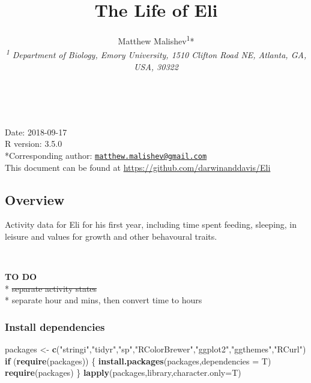 \documentclass[10,portrait]{article}
\title{The Life of Eli}
\author{Matthew Malishev\textsuperscript{1}*\\
\emph{\textsuperscript{1} Department of Biology, Emory University, 1510
Clifton Road NE, Atlanta, GA, USA, 30322}}
\date{}
\newenvironment{Shaded}{\begin{snugshade}}{\end{snugshade}}
\newcommand{\KeywordTok}[1]{\textcolor[rgb]{0.13,0.29,0.53}{\textbf{#1}}}
\newcommand{\DataTypeTok}[1]{\textcolor[rgb]{0.13,0.29,0.53}{#1}}
\newcommand{\StringTok}[1]{\textcolor[rgb]{0.31,0.60,0.02}{#1}}
\newcommand{\ControlFlowTok}[1]{\textcolor[rgb]{0.13,0.29,0.53}{\textbf{#1}}}
\newcommand{\NormalTok}[1]{#1}
\begin{document}
\maketitle

{
\hypersetup{linkcolor=black}
\setcounter{tocdepth}{4}
\tableofcontents
}
~

Date: 2018-09-17\\
R version: 3.5.0\\
*Corresponding author:
\href{mailto:matthew.malishev@gmail.com}{\nolinkurl{matthew.malishev@gmail.com}}\\
This document can be found at
\url{https://github.com/darwinanddavis/Eli}

\newpage  

\subsection{Overview}\label{overview}

Activity data for Eli for his first year, including time spent feeding,
sleeping, in leisure and values for growth and other behavoural traits.

~

\textbf{TO DO}\\
* \sout{separate activity states}\\
* separate hour and mins, then convert time to hours

\subsubsection{Install dependencies}\label{install-dependencies}

\begin{Shaded}
\begin{Highlighting}[]
\NormalTok{packages <-}\StringTok{ }\KeywordTok{c}\NormalTok{(}\StringTok{"stringi"}\NormalTok{,}\StringTok{"tidyr"}\NormalTok{,}\StringTok{"sp"}\NormalTok{,}\StringTok{"RColorBrewer"}\NormalTok{,}\StringTok{"ggplot2"}\NormalTok{,}\StringTok{"ggthemes"}\NormalTok{,}\StringTok{"RCurl"}\NormalTok{)   }
\ControlFlowTok{if}\NormalTok{ (}\KeywordTok{require}\NormalTok{(packages)) \{}
    \KeywordTok{install.packages}\NormalTok{(packages,}\DataTypeTok{dependencies =}\NormalTok{ T)}
    \KeywordTok{require}\NormalTok{(packages)}
\NormalTok{\}}
\KeywordTok{lapply}\NormalTok{(packages,library,}\DataTypeTok{character.only=}\NormalTok{T)}
\end{Highlighting}
\end{Shaded}
\end{document}
